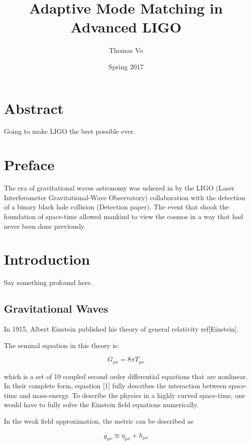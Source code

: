 \documentclass[oneside]{book}
\title{Adaptive Mode Matching in Advanced LIGO}
\date{Spring 2017}
\author{Thomas Vo}
\begin{document}
	
\doublespacing
		\chapter*{Abstract}
		Going to make LIGO the best possible ever.
	
	\maketitle
		\chapter*{Preface}
		The era of gravitational waves astronomy was ushered in by the LIGO (Laser Interferometer Gravitational-Wave Observatory) collaboration with the detection of a binary black hole collision (Detection paper).  The event that shook the foundation of space-time allowed mankind to view the cosmos in a way that had never been done previously. 
	\tableofcontents

\chapter{Introduction}

	Say something profound here.

	\section{Gravitational Waves}\label{gravitational waves}
	In 1915, Albert Einstein published his theory of general relativity ref[Einstein].
	
	The seminal equation in this theory is:
	
	\begin{equation} \label{einstein}
	G_{\mu \nu} = 8 \pi T_{\mu \nu}
	\end{equation}
	
	which is a set of 10 coupled second order differential equations that are nonlinear.  In their complete form, equation [1] fully describes the interaction between space-time and mass-energy. To describe the physics in a highly curved space-time, one would have to fully solve the Einstein field equations numerically.  
	
	
	In the weak field approximation, the metric can be described as
	
	\begin{equation} \label{weak}
	g_{\mu \nu}  \approxeq \eta_{\mu \nu} + h_{\mu \nu}
	\end{equation}
	
\end{document}
